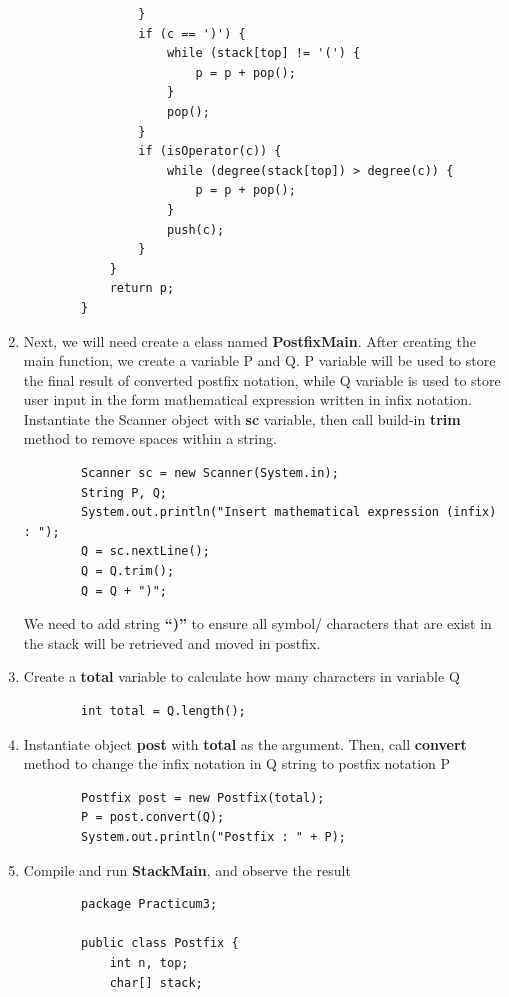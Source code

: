 \documentclass[12pt,titlepage]{article}
\begin{document}
\begin{enumerate}
\begin{verbatim}
                }
                if (c == ')') {
                    while (stack[top] != '(') {
                        p = p + pop();
                    }
                    pop();
                }
                if (isOperator(c)) {
                    while (degree(stack[top]) > degree(c)) {
                        p = p + pop();
                    }
                    push(c);
                }
            }
            return p;
        }
    \end{verbatim}
    \item Next, we will need create a class named \textbf{PostfixMain}. After creating the main function, we create a variable P and Q. P variable will be used to store the final result of converted postfix notation, while Q variable is used to store user input in the form mathematical expression written in infix notation. Instantiate the Scanner object with \textbf{sc} variable, then call build-in \textbf{trim} method to remove spaces within a string.
    \begin{verbatim}
        Scanner sc = new Scanner(System.in);
        String P, Q;
        System.out.println("Insert mathematical expression (infix) : ");
        Q = sc.nextLine();
        Q = Q.trim();
        Q = Q + ")";
    \end{verbatim} 
    We need to add string \textbf{“)”} to ensure all symbol/ characters that are exist in the stack will be retrieved and moved in postfix.
    \item Create a \textbf{total} variable to calculate how many characters in variable Q
    \begin{verbatim}
        int total = Q.length();
    \end{verbatim}
    \item Instantiate object \textbf{post} with \textbf{total} as the argument. Then, call \textbf{convert} method to change the infix notation in Q string to postfix notation P
    \begin{verbatim}
        Postfix post = new Postfix(total);
        P = post.convert(Q);
        System.out.println("Postfix : " + P);
    \end{verbatim}
    \item Compile and run \textbf{StackMain}, and observe the result
    \begin{verbatim}
        package Practicum3;

        public class Postfix {
            int n, top;
            char[] stack;
            

\end{verbatim}
\end{enumerate}
\end{document}
